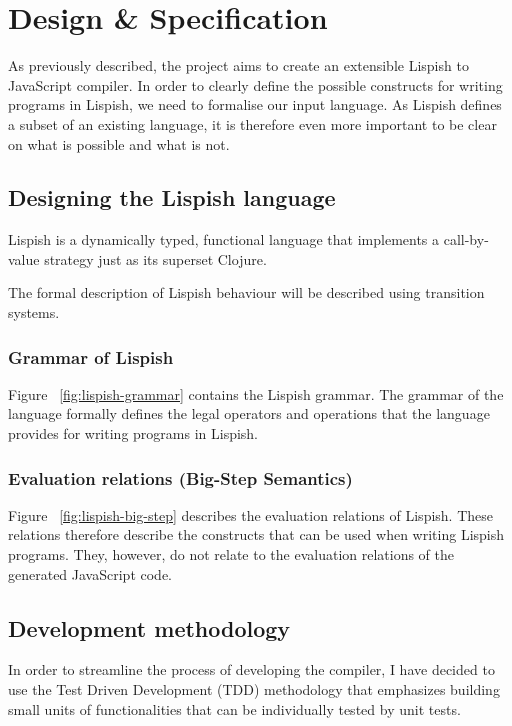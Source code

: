 \chapter{Design \& Specification}

As previously described, the project aims to create an extensible Lispish to JavaScript compiler. 
In order to clearly define the possible constructs for writing programs in Lispish, we need to formalise our input language. 
As Lispish defines a subset of an existing language, it is therefore even more important to be clear on what is possible and what is not. 

\section{Designing the Lispish language}\label{design-specification}

Lispish is a dynamically typed, functional language that implements a call-by-value strategy just as its superset Clojure.

The formal description of Lispish behaviour will be described using transition systems.

\subsection{Grammar of Lispish}



Figure ~\ref{fig:lispish-grammar} contains the Lispish grammar. The grammar of the language formally defines the legal operators and operations that the language provides for writing programs in Lispish.

\subsection{Evaluation relations (Big-Step Semantics)}

Figure ~\ref{fig:lispish-big-step} describes the evaluation relations of Lispish. These relations therefore describe the constructs that can be used when writing Lispish programs. They, however, do not relate to the evaluation relations of the generated JavaScript code. 



\section{Development methodology}
In order to streamline the process of developing the compiler, I have decided to use the Test Driven Development (TDD) methodology that emphasizes building small units of functionalities that can be individually tested by unit tests. 

